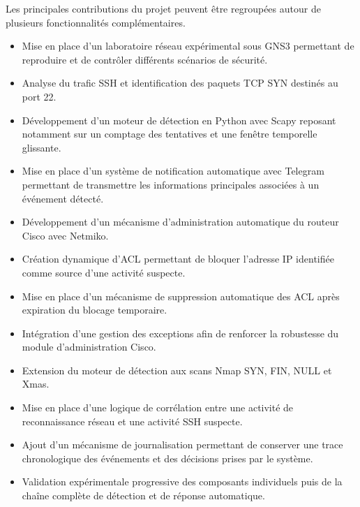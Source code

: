 Les principales contributions du projet peuvent être regroupées autour de plusieurs fonctionnalités complémentaires.

\begin{itemize}
    \item Mise en place d'un laboratoire réseau expérimental sous GNS3 permettant de reproduire et de contrôler différents scénarios de sécurité.

    \item Analyse du trafic SSH et identification des paquets TCP SYN destinés au port 22.

    \item Développement d'un moteur de détection en Python avec Scapy reposant notamment sur un comptage des tentatives et une fenêtre temporelle glissante.

    \item Mise en place d'un système de notification automatique avec Telegram permettant de transmettre les informations principales associées à un événement détecté.

    \item Développement d'un mécanisme d'administration automatique du routeur Cisco avec Netmiko.

    \item Création dynamique d'ACL permettant de bloquer l'adresse IP identifiée comme source d'une activité suspecte.

    \item Mise en place d'un mécanisme de suppression automatique des ACL après expiration du blocage temporaire.

    \item Intégration d'une gestion des exceptions afin de renforcer la robustesse du module d'administration Cisco.

    \item Extension du moteur de détection aux scans Nmap SYN, FIN, NULL et Xmas.

    \item Mise en place d'une logique de corrélation entre une activité de reconnaissance réseau et une activité SSH suspecte.

    \item Ajout d'un mécanisme de journalisation permettant de conserver une trace chronologique des événements et des décisions prises par le système.

    \item Validation expérimentale progressive des composants individuels puis de la chaîne complète de détection et de réponse automatique.
\end{itemize}



